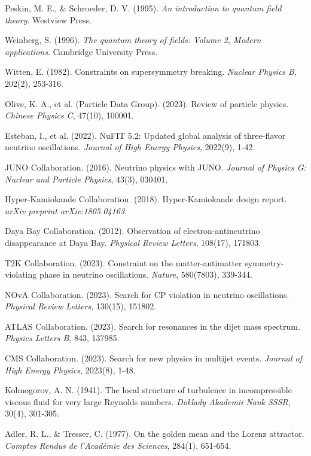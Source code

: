 \documentclass[12pt,a4paper]{article}
\begin{document}
\begin{itemize}
\begin{itemize}
\begin{thebibliography}{99}
 Peskin, M. E., & Schroeder, D. V. (1995). \textit{An introduction to quantum field theory}. Westview Press.

 Weinberg, S. (1996). \textit{The quantum theory of fields: Volume 2, Modern applications}. Cambridge University Press.

 Witten, E. (1982). Constraints on supersymmetry breaking. \textit{Nuclear Physics B}, 202(2), 253-316.

 Olive, K. A., et al. (Particle Data Group). (2023). Review of particle physics. \textit{Chinese Physics C}, 47(10), 100001.

 Esteban, I., et al. (2022). NuFIT 5.2: Updated global analysis of three-flavor neutrino oscillations. \textit{Journal of High Energy Physics}, 2022(9), 1-42.

 JUNO Collaboration. (2016). Neutrino physics with JUNO. \textit{Journal of Physics G: Nuclear and Particle Physics}, 43(3), 030401.

 Hyper-Kamiokande Collaboration. (2018). Hyper-Kamiokande design report. \textit{arXiv preprint arXiv:1805.04163}.

 Daya Bay Collaboration. (2012). Observation of electron-antineutrino disappearance at Daya Bay. \textit{Physical Review Letters}, 108(17), 171803.

 T2K Collaboration. (2023). Constraint on the matter-antimatter symmetry-violating phase in neutrino oscillations. \textit{Nature}, 580(7803), 339-344.

 NOvA Collaboration. (2023). Search for CP violation in neutrino oscillations. \textit{Physical Review Letters}, 130(15), 151802.

 ATLAS Collaboration. (2023). Search for resonances in the dijet mass spectrum. \textit{Physics Letters B}, 843, 137985.

 CMS Collaboration. (2023). Search for new physics in multijet events. \textit{Journal of High Energy Physics}, 2023(8), 1-48.

 Kolmogorov, A. N. (1941). The local structure of turbulence in incompressible viscous fluid for very large Reynolds numbers. \textit{Doklady Akademii Nauk SSSR}, 30(4), 301-305.

 Adler, R. L., \& Tresser, C. (1977). On the golden mean and the Lorenz attractor. \textit{Comptes Rendus de l'Académie des Sciences}, 284(1), 651-654.


\end{thebibliography}
\end{itemize}
\end{itemize}
\end{document}
